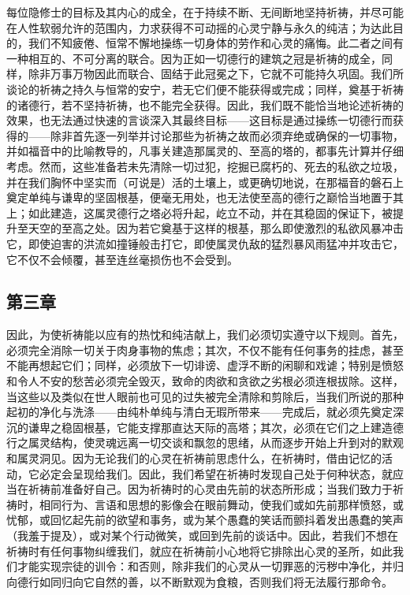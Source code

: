 每位隐修士的目标及其内心的成全，在于持续不断、无间断地坚持祈祷，并尽可能在人性软弱允许的范围内，力求获得不可动摇的心灵宁静与永久的纯洁；为达此目的，我们不知疲倦、恒常不懈地操练一切身体的劳作和心灵的痛悔。此二者之间有一种相互的、不可分离的联合。因为正如一切德行的建筑之冠是祈祷的成全，同样，除非万事万物因此而联合、固结于此冠冕之下，它就不可能持久巩固。我们所谈论的祈祷之持久与恒常的安宁，若无它们便不能获得或完成；同样，奠基于祈祷的诸德行，若不坚持祈祷，也不能完全获得。因此，我们既不能恰当地论述祈祷的效果，也无法通过快速的言谈深入其最终目标——这目标是通过操练一切德行而获得的——除非首先逐一列举并讨论那些为祈祷之故而必须弃绝或确保的一切事物，并如福音中的比喻教导的，凡事关建造那属灵的、至高的塔的，都事先计算并仔细考虑。然而，这些准备若未先清除一切过犯，挖掘已腐朽的、死去的私欲之垃圾，并在我们胸怀中坚实而（可说是）活的土壤上，或更确切地说，在那福音的磐石上奠定单纯与谦卑的坚固根基，便毫无用处，也无法使至高的德行之巅恰当地置于其上；如此建造，这属灵德行之塔必将升起，屹立不动，并在其稳固的保证下，被提升至天空的至高之处。因为若它奠基于这样的根基，那么即使激烈的私欲风暴冲击它，即使迫害的洪流如撞锤般击打它，即使属灵仇敌的猛烈暴风雨猛冲并攻击它，它不仅不会倾覆，甚至连丝毫损伤也不会受到。\par


\subsection{第三章}

\par

因此，为使祈祷能以应有的热忱和纯洁献上，我们必须切实遵守以下规则。首先，必须完全消除一切关于肉身事物的焦虑；其次，不仅不能有任何事务的挂虑，甚至不能再想起它们；同样，必须放下一切诽谤、虚浮不断的闲聊和戏谑；特别是愤怒和令人不安的愁苦必须完全毁灭，致命的肉欲和贪欲之劣根必须连根拔除。这样，当这些以及类似在世人眼前也可见的过失被完全清除和剪除后，当我们所说的那种起初的净化与洗涤——由纯朴单纯与清白无瑕所带来——完成后，就必须先奠定深沉的谦卑之稳固根基，它能支撑那直达天际的高塔；其次，必须在它们之上建造德行之属灵结构，使灵魂远离一切交谈和飘忽的思绪，从而逐步开始上升到对的默观和属灵洞见。因为无论我们的心灵在祈祷前思虑什么，在祈祷时，借由记忆的活动，它必定会呈现给我们。因此，我们希望在祈祷时发现自己处于何种状态，就应当在祈祷前准备好自己。因为祈祷时的心灵由先前的状态所形成；当我们致力于祈祷时，相同行为、言语和思想的影像会在眼前舞动，使我们或如先前那样愤怒，或忧郁，或回忆起先前的欲望和事务，或为某个愚蠢的笑话而颤抖着发出愚蠢的笑声（我羞于提及），或对某个行动微笑，或回到先前的谈话中。因此，若我们不想在祈祷时有任何事物纠缠我们，就应在祈祷前小心地将它排除出心灵的圣所，如此我们才能实现宗徒的训令：和否则，除非我们的心灵从一切罪恶的污秽中净化，并归向德行如同归向它自然的善，以不断默观为食粮，否则我们将无法履行那命令。\par

